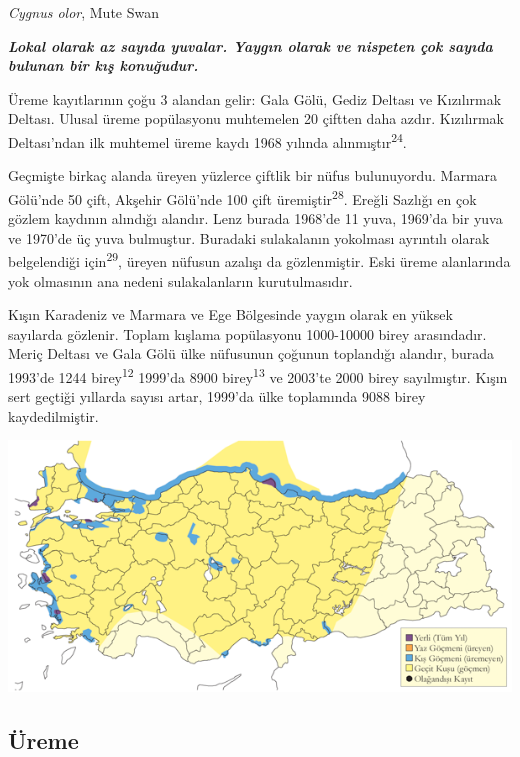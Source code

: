 \documentclass[
  letterpaper,
  DIV=11,
  numbers=noendperiod]{scrreprt}
\begin{document}
\emph{Cygnus olor}, Mute Swan

\textbf{\emph{Lokal olarak az sayıda yuvalar. Yaygın olarak ve nispeten
çok sayıda bulunan bir kış konuğudur.}}

Üreme kayıtlarının çoğu 3 alandan gelir: Gala Gölü, Gediz Deltası ve
Kızılırmak Deltası. Ulusal üreme popülasyonu muhtemelen 20 çiftten daha
azdır. Kızılırmak Deltası'ndan ilk muhtemel üreme kaydı 1968 yılında
alınmıştır\textsuperscript{24}.

Geçmişte birkaç alanda üreyen yüzlerce çiftlik bir nüfus bulunuyordu.
Marmara Gölü'nde 50 çift, Akşehir Gölü'nde 100 çift
üremiştir\textsuperscript{28}. Ereğli Sazlığı en çok gözlem kaydının
alındığı alandır. Lenz burada 1968'de 11 yuva, 1969'da bir yuva ve
1970'de üç yuva bulmuştur. Buradaki sulakalanın yokolması ayrıntılı
olarak belgelendiği için\textsuperscript{29}, üreyen nüfusun azalışı da
gözlenmiştir. Eski üreme alanlarında yok olmasının ana nedeni
sulakalanların kurutulmasıdır.

Kışın Karadeniz ve Marmara ve Ege Bölgesinde yaygın olarak en yüksek
sayılarda gözlenir. Toplam kışlama popülasyonu 1000-10000 birey
arasındadır. Meriç Deltası ve Gala Gölü ülke nüfusunun çoğunun
toplandığı alandır, burada 1993'de 1244 birey\textsuperscript{12}
1999'da 8900 birey\textsuperscript{13} ve 2003'te 2000 birey
sayılmıştır. Kışın sert geçtiği yıllarda sayısı artar, 1999'da ülke
toplamında 9088 birey kaydedilmiştir.

\includegraphics{images/harita_Page_008.png}

\hypertarget{uxfcreme-7}{%
\subsection{\texorpdfstring{\textbf{Üreme}}{Üreme}}\label{uxfcreme-7}}
\end{document}
